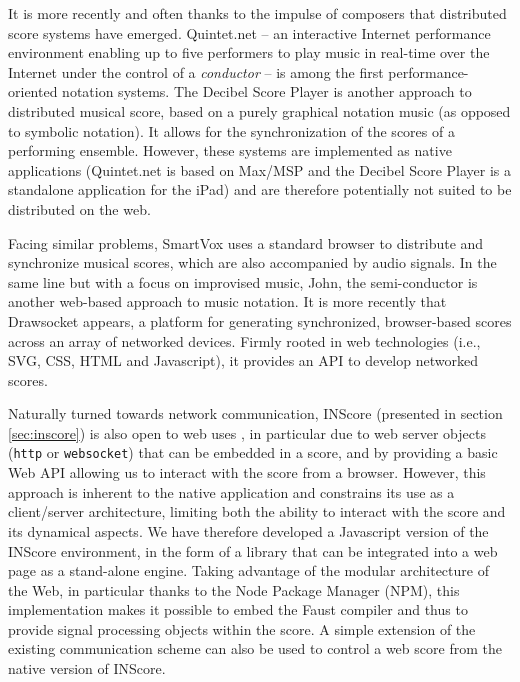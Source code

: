 \documentclass{article}
\newcommand{\icode}[1]	{{\small \texttt{#1}}}
\begin{document}
It is more recently and often thanks to the impulse of composers that distributed score systems have emerged.
Quintet.net \cite{doi:10.1162/leon.2005.38.1.23} -- an interactive Internet performance environment enabling up to five performers to play music in real-time over the Internet under the control of a \emph{conductor} -- is among the first performance-oriented notation systems. 
The Decibel Score Player \cite{cat_hope_2015_1289610} is another approach to distributed musical score, based on a purely graphical notation music (as opposed to symbolic notation). It allows for the synchronization of the scores of a performing ensemble.
However, these systems are implemented as native applications (Quintet.net is based on Max/MSP and the Decibel Score Player is a standalone application for the iPad) and are therefore potentially not suited to be distributed on the web.

Facing similar problems, SmartVox \cite{bell:hal-01660184} uses a standard browser to distribute and synchronize musical scores, which are also accompanied by audio signals. In the same line but with a focus on improvised music, John, the semi-conductor \cite{goudard:hal-01923258} is another web-based approach to music notation.
It is more recently that Drawsocket \cite{rama_gottfried_2019_3373369} appears, a platform for generating synchronized, browser-based scores across an array of networked devices. Firmly rooted in web technologies (i.e., SVG, CSS, HTML and Javascript), it provides an API to develop networked scores.

Naturally turned towards network communication, INScore \cite{fober:hal-02158817} (presented in section \ref{sec:inscore}) is also open to web uses \cite{fober:hal-01348511}, in particular due to web server objects (\icode{http} or \icode{websocket}) that can be embedded in a score, and by providing a basic Web API allowing us to interact with the score from a browser. 
However, this approach is inherent to the native application and constrains its use as a client/server architecture, limiting both the ability to interact with the score and its dynamical aspects. 
We have therefore developed a Javascript version of the INScore environment, in the form of a library that can be integrated into a web page as a stand-alone engine. 
Taking advantage of the modular architecture of the Web, in particular thanks to the Node Package Manager (NPM), this implementation makes it possible to embed the Faust compiler \cite{orlarey:hal-02159014} \cite{ren:hal-03087763} and thus to provide signal processing objects within the score.
A simple extension of the existing communication scheme can also be used to control a web score from the native version of INScore.
\end{document}
